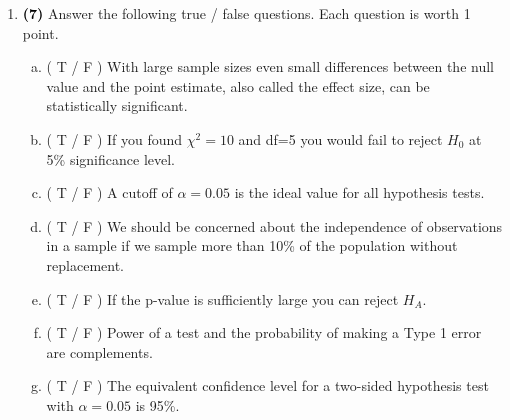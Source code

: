\documentclass[11pt]{article}
\newcommand{\solnMult}[1]{ #1 }	%
\newcommand{\pts}[1]{ \textbf{{\footnotesize \textcolor{black}{(#1)}}} }	%
\begin{document}
\begin{enumerate}
%

\vspace{2cm}

\item \pts{7} Answer the following true / false questions. Each question is worth 1 point.
\begin{enumerate}[(a)]
\vspace{3mm} \item ( \solnMult{T} / F ) With large sample sizes even small differences between the null value and the point estimate, also called the effect size, can be statistically significant.
\vspace{3mm} \item ( \solnMult{T} / F ) If you found $\chi^2=10$ and df=5 you would fail to reject $H_0$ at 5\% significance level.
\vspace{3mm} \item ( T / \solnMult{F} ) A cutoff of $\alpha = 0.05$ is the ideal value for all hypothesis tests.
\vspace{3mm} \item ( \solnMult{T} / F ) We should be concerned about the independence of observations in a sample if we sample more than 10\% of the population without replacement.
\vspace{3mm} \item ( T / \solnMult{F} ) If the p-value is sufficiently large you can reject $H_A$.
\vspace{3mm} \item ( T / \solnMult{F} ) Power of a test and the probability of making a Type 1 error are complements.
\vspace{3mm} \item ( \solnMult{T} / F ) The equivalent confidence level for a two-sided hypothesis test with $\alpha = 0.05$ is 95\%.
\vspace{10mm}
\end{enumerate}

\end{enumerate}
%
%
\end{document}
